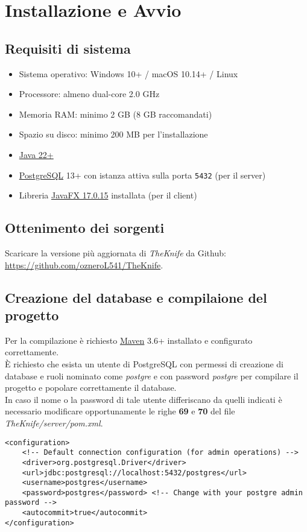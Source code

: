 \section{Installazione e Avvio}
\label{cap:installazione}
\subsection{Requisiti di sistema}
\begin{itemize}
    \item Sistema operativo: Windows 10+ / macOS 10.14+ / Linux
    \item Processore: almeno dual-core 2.0 GHz
    \item Memoria RAM: minimo 2 GB (8 GB raccomandati)
    \item Spazio su disco: minimo 200 MB per l'installazione
    \item \href{www.java.com}{Java 22+}
    \item \href{www.postgresql.org}{PostgreSQL} 13+ con istanza attiva sulla porta \texttt{5432} (per il server)
    \item Libreria \href{https://gluonhq.com/products/javafx/}{JavaFX 17.0.15} installata (per il client)
\end{itemize}

\subsection{Ottenimento dei sorgenti}
Scaricare la versione più aggiornata di \textit{TheKnife} da Github:\\
\href{https://github.com/ozneroL541/TheKnife}{https://github.com/ozneroL541/TheKnife}.

\subsection{Creazione del database e compilaione del progetto}
Per la compilazione è richiesto \href{maven.apache.org}{Maven} 3.6+ installato e configurato correttamente.\\
\`E richiesto che esista un utente di PostgreSQL con permessi 
di creazione di database e ruoli nominato come \textit{postgre} e con 
password \textit{postgre} per compilare il progetto e popolare correttamente 
il database.\\
In caso il nome o la password di tale utente differiscano da quelli 
indicati
è necessario modificare opportunamente le righe \textbf{69} e \textbf{70} 
del file \textit{TheKnife/server/pom.xml}.
\begin{verbatim}
<configuration>
    <!-- Default connection configuration (for admin operations) -->
    <driver>org.postgresql.Driver</driver>
    <url>jdbc:postgresql://localhost:5432/postgres</url>
    <username>postgres</username>
    <password>postgres</password> <!-- Change with your postgre admin password -->
    <autocommit>true</autocommit>
</configuration>
\end{verbatim}

